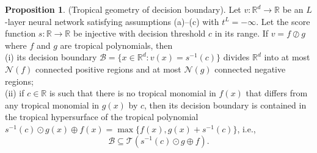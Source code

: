 \documentclass{article}
\theoremstyle{definition}
\newtheorem{proposition}[theorem]{Proposition}
\begin{document}
\begin{proposition}\cite{zhang2018tropical}(Tropical geometry of decision boundary).
Let $v : \mathbb{R}^{d} \to \mathbb{R}$ be an $L$-layer neural network satisfying assumptions (a)–(c) with $t^{L}=-\infty$. Let the score function $s: \mathbb{R} \to \mathbb{R}$ be injective with decision threshold $c$ in its range. If $v = f \oslash g$ where $f$ and $g$ are tropical polynomials, then \\
(i) its decision boundary $\mathcal{B}=\{ x \in \mathbb{R}^{d} : v(x) = s^{-1}(c)\}$ divides $\mathbb{R}^{d}$ into at most $\mathcal{N} (f)$ connected positive regions and at most $\mathcal{N}(g)$ connected negative regions; \\
(ii) if $c \in \mathbb{R}$ is such that there is no tropical monomial in $f(x)$ that differs from any tropical monomial in $g(x)$ by $c$, then its decision boundary is contained in the tropical hypersurface of the tropical polynomial $s^{-1}(c) \odot g(x) \oplus f(x) = \max\{f(x), g(x) + s^{-1}(c)\}$, i.e.,
$$\mathcal{B} \subseteq \mathcal{T} (s^{-1}(c) \odot g \oplus f).$$
\end{proposition}
\end{document}
